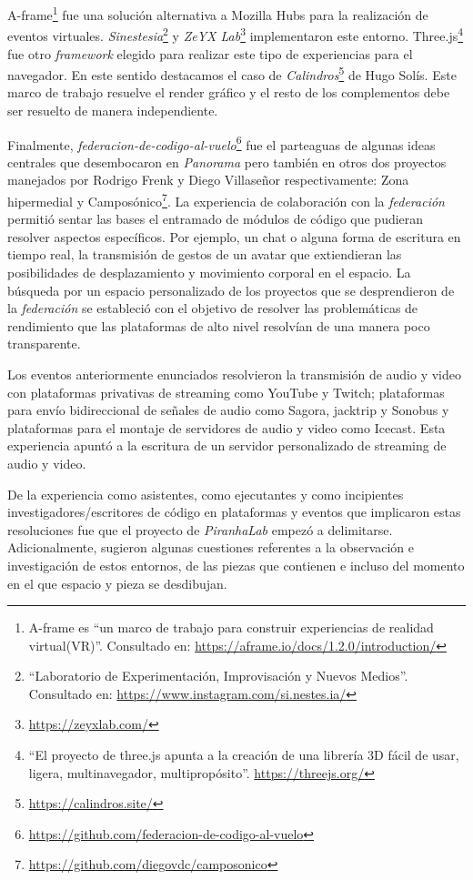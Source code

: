 A-frame\footnote{ A-frame es ``un marco de trabajo para construir experiencias de realidad virtual(VR)''. Consultado en: \url{https://aframe.io/docs/1.2.0/introduction/}} fue una solución alternativa a Mozilla Hubs para la realización de eventos virtuales. \textit{Sinestesia}\footnote{``Laboratorio de Experimentación, Improvisación y Nuevos Medios''. Consultado en: \url{https://www.instagram.com/si.nestes.ia/}} y \textit{ZeYX Lab}\footnote{\url{https://zeyxlab.com/}} implementaron este entorno. Three.js\footnote{``El proyecto de three.js apunta a la creación de una librería 3D fácil de usar, ligera, multinavegador, multipropósito''. \url{https://threejs.org/}} fue otro \textit{framework} elegido para realizar este tipo de experiencias para el navegador. En este sentido destacamos el caso de \textit{Calindros}\footnote{\url{https://calindros.site/}} de Hugo Solís. Este marco de trabajo resuelve el render gráfico y el resto de los complementos debe ser resuelto de manera independiente. %

Finalmente, \textit{federacion-de-codigo-al-vuelo}\footnote{\url{https://github.com/federacion-de-codigo-al-vuelo}} fue el parteaguas de algunas ideas centrales que desembocaron en \textit{Panorama} pero también en otros dos proyectos manejados por Rodrigo Frenk y Diego Villaseñor respectivamente: Zona hipermedial y Camposónico\footnote{\url{https://github.com/diegovdc/camposonico}}. La experiencia de colaboración con la \textit{federación} permitió sentar las bases el entramado de módulos de código que pudieran resolver aspectos específicos. Por ejemplo,  un chat o alguna forma de escritura en tiempo real, la transmisión de gestos de un avatar que extiendieran las posibilidades de desplazamiento y movimiento corporal en el espacio. La búsqueda por un espacio personalizado de los proyectos que se desprendieron de la \textit{federación} se estableció con el objetivo de resolver las problemáticas de rendimiento que las plataformas de alto nivel resolvían de una manera poco transparente. 

Los eventos anteriormente enunciados resolvieron la transmisión de audio y video con  plataformas privativas de streaming como YouTube y Twitch; plataformas para envío bidireccional de señales de audio como Sagora, jacktrip y Sonobus y plataformas para el montaje de servidores de audio y video como Icecast. Esta experiencia apuntó a la escritura de un servidor personalizado de streaming de audio y video. %

De la experiencia como asistentes, como ejecutantes y como incipientes investigadores/escritores de código en plataformas y eventos que implicaron estas resoluciones fue que el proyecto de \textit{PiranhaLab} empezó a delimitarse. Adicionalmente, sugieron algunas cuestiones referentes a la observación e investigación de estos entornos, de las piezas que contienen e incluso del momento en el que espacio y pieza se desdibujan. 
